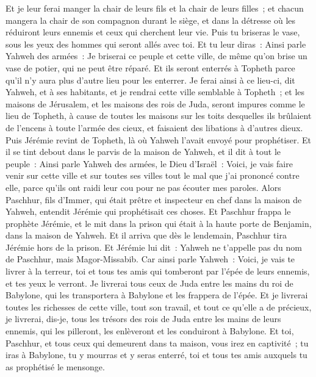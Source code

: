 \begin{multicols}{2}
Et je leur ferai manger la chair de leurs fils et la chair de leurs filles~; et chacun mangera la chair de son compagnon durant le siège, et dans la détresse où les réduiront leurs ennemis et ceux qui cherchent leur vie.
Puis tu briseras le vase, sous les yeux des hommes qui seront allés avec toi.
Et tu leur diras~: Ainsi parle Yahweh des armées~: Je briserai ce peuple et cette ville, de même qu'on brise un vase de potier, qui ne peut être réparé. Et ils seront enterrés à Topheth parce qu'il n'y aura plus d'autre lieu pour les enterrer.
Je ferai ainsi à ce lieu-ci, dit Yahweh, et à ses habitants, et je rendrai cette ville semblable à Topheth~;
et les maisons de Jérusalem, et les maisons des rois de Juda, seront impures comme le lieu de Topheth, à cause de toutes les maisons sur les toits desquelles ils brûlaient de l'encens à toute l'armée des cieux, et faisaient des libations à d'autres dieux.
Puis Jérémie revint de Topheth, là où Yahweh l'avait envoyé pour prophétiser. Et il se tint debout dans le parvis de la maison de Yahweh, et il dit à tout le peuple~:
Ainsi parle Yahweh des armées, le Dieu d'Israël~: Voici, je vais faire venir sur cette ville et sur toutes ses villes tout le mal que j'ai prononcé contre elle, parce qu'ils ont raidi leur cou pour ne pas écouter mes paroles.
\VerseOne{}Alors Paschhur, fils d'Immer, qui était prêtre et inspecteur en chef dans la maison de Yahweh, entendit Jérémie qui prophétisait ces choses.
Et Paschhur frappa le prophète Jérémie, et le mit dans la prison qui était à la haute porte de Benjamin, dans la maison de Yahweh.
Et il arriva que dès le lendemain, Paschhur tira Jérémie hors de la prison. Et Jérémie lui dit~: Yahweh ne t'appelle pas du nom de Paschhur, mais Magor-Missabib.
Car ainsi parle Yahweh~: Voici, je vais te livrer à la terreur, toi et tous tes amis qui tomberont par l'épée de leurs ennemis, et tes yeux le verront. Je livrerai tous ceux de Juda entre les mains du roi de Babylone, qui les transportera à Babylone et les frappera de l'épée.
Et je livrerai toutes les richesses de cette ville, tout son travail, et tout ce qu'elle a de précieux, je livrerai, dis-je, tous les trésors des rois de Juda entre les mains de leurs ennemis, qui les pilleront, les enlèveront et les conduiront à Babylone.
Et toi, Paschhur, et tous ceux qui demeurent dans ta maison, vous irez en captivité~; tu iras à Babylone, tu y mourras et y seras enterré, toi et tous tes amis auxquels tu as prophétisé le mensonge.

\end{multicols}
